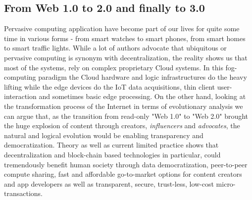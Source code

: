 \documentclass{article}
\begin{document}
\subsection{From Web 1.0 to 2.0 and finally to 3.0}
Pervasive computing application have become part of our lives for quite some time in various forms - from smart watches to smart phones, from smart homes to smart traffic lights. While a lot of authors advocate that ubiquitous or pervasive computing \cite{hansmann2003pervasive} \cite{conti2012looking} \cite{hansmann2013pervasive} is synonym with decentralization, the reality shows us that most of the systems, rely on complex proprietary Cloud systems. In this fog-computing\cite{chan2017fog} paradigm the Cloud hardware and logic infrastructures do the heavy lifting while the edge devices do  the IoT data acquisitions, thin client user-interaction and sometimes basic edge processing. On the other hand, looking at the transformation process of the Internet in terms of evolutionary analysis we can argue that, as the transition from read-only "Web 1.0" to "Web 2.0" brought the huge explosion of content through creators, \emph{influencers} and \emph{advocates}, the natural and logical evolution would be enabling transparency and democratization. Theory as well as current limited practice shows that decentralization \cite{voshmgir2019token} \cite{sunyaev2021token} and block-chain based technologies \cite{nofer2017blockchain} \cite{zheng2018blockchain} \cite{monrat2019survey} in particular, could tremendously benefit human society through data democratization, peer-to-peer compute sharing, fast and affordable go-to-market options for content creators and app developers as well as transparent, secure, trust-less, low-cost micro-transactions.
\end{document}
